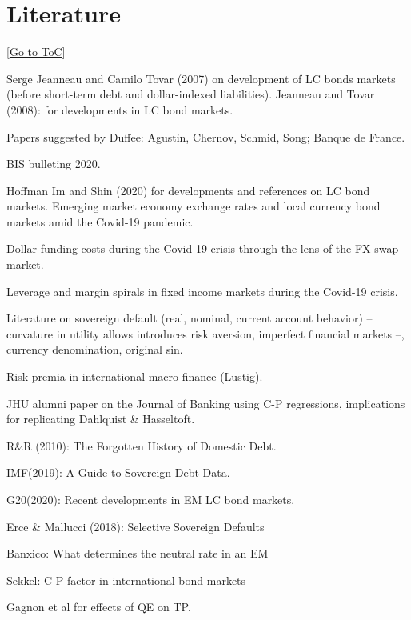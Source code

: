 \documentclass[12pt]{article}
\newcommand{\gototoc}{\vspace{-1.8cm} \null\hfill [\hyperlink{toc}{Go to ToC}] \newline}
\begin{document}
\section{Literature}
\gototoc
\begin{todolist}
	\item Serge Jeanneau and Camilo Tovar (2007) on development of LC bonds markets (before short-term debt and dollar-indexed liabilities). Jeanneau and Tovar (2008): for developments in LC bond markets.
	\item Papers suggested by Duffee: Agustin, Chernov, Schmid, Song; Banque de France.
	\item BIS bulleting 2020.
	\begin{todolist}
		\item Hoffman Im and Shin (2020) for developments and references on LC bond markets. Emerging market economy exchange rates and local currency bond markets amid the Covid-19 pandemic.
		\item Dollar funding costs during the Covid-19 crisis through the lens of the FX swap market.
		\item Leverage and margin spirals in fixed income markets during the Covid-19 crisis.
		\item Literature on sovereign default (real, nominal, current account behavior) --curvature in utility allows introduces risk aversion, imperfect financial markets --, currency denomination, original sin.
		\item Risk premia in international macro-finance (Lustig).
	\end{todolist}
	
	\item JHU alumni paper on the Journal of Banking using C-P regressions, implications for replicating Dahlquist \& Hasseltoft.
	\item R\&R (2010): The Forgotten History of Domestic Debt.
	\item IMF(2019): A Guide to Sovereign Debt Data.
	\item G20(2020): Recent developments in EM LC bond markets.
	\item Erce \& Mallucci (2018): Selective Sovereign Defaults
	\item Banxico: What determines the neutral rate in an EM
	\item Sekkel: C-P factor in international bond markets
	\item Gagnon et al for effects of QE on TP.
\end{todolist}
\end{document}
